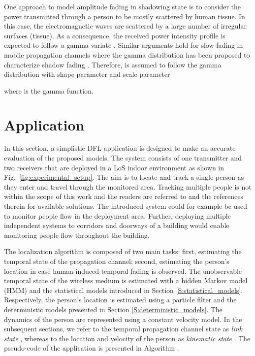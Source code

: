 \documentclass[journal, 10pt, twocolumn, balance]{IEEEtran}
\begin{document}
One approach to model amplitude fading in shadowing state is to consider the power transmitted through a person to be mostly scattered by human tissue. In this case, the electromagnetic waves are scattered by a large number of irregular surfaces (tissue). As a consequence, the received power intensity profile is expected to follow a gamma variate \cite{Jakeman1982}. Similar arguments hold for slow-fading in mobile propagation channels where the gamma distribution has been proposed to characterize shadow fading \cite{Abdi1999}. Therefore,  is assumed to follow the gamma distribution with shape parameter  and scale parameter 

where  is the gamma function.


\section{Application} \label{S:application}
In this section, a simplistic DFL application is designed to make an accurate evaluation of the proposed models.  
The system consists of one transmitter and two receivers that are deployed in a LoS indoor environment as shown in Fig.~\ref{fig:experimental_setup}. The aim is to locate and track a single person as they enter and travel through the monitored area.  Tracking multiple people is not within the scope of this work and the readers are referred to \cite{bocca2013b} and the references therein for available solutions. The introduced system could for example be used to monitor people flow in the deployment area. Further, deploying multiple independent systems to corridors and doorways of a building would enable monitoring people flow throughout the building.


The localization algorithm is composed of two main tasks: first, estimating the temporal state of the propagation channel; second, estimating the person's location in case human-induced temporal fading is observed. The unobservable temporal state of the wireless medium is estimated with a hidden Markov model (HMM) and the statistical models introduced in Section \ref{S:statistical_models}. Respectively, the person's location is estimated using a particle filter and the deterministic models presented in Section \ref{S:deterministic_models}. The dynamics of the person are represented using a constant velocity model. In the subsequent sections, we refer to the temporal propagation channel state as \emph{link state} , whereas to the location and velocity of the person as \emph{kinematic state} . The pseudo-code of the application is presented in Algorithm .
\end{document}
